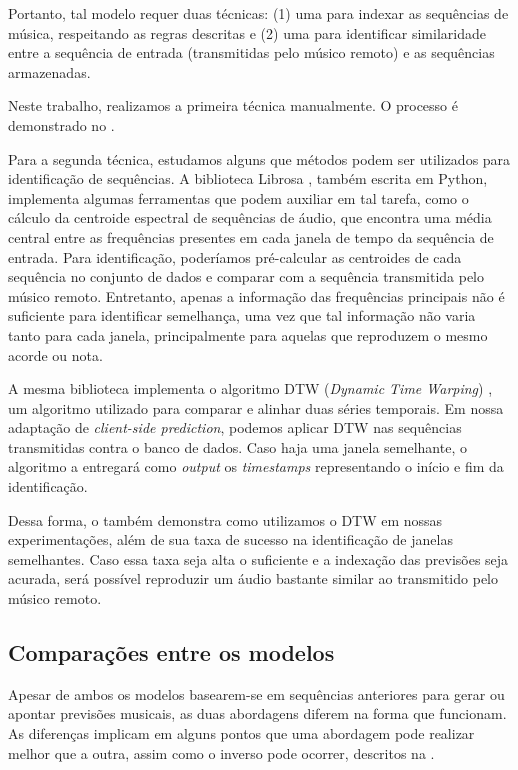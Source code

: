 Portanto, tal modelo requer duas técnicas: (1) uma para indexar as sequências de música, respeitando as regras descritas e (2) uma para identificar similaridade entre a sequência de entrada (transmitidas pelo músico remoto) e as sequências armazenadas.

Neste trabalho, realizamos a primeira técnica manualmente. O processo é demonstrado no .

Para a segunda técnica, estudamos alguns que métodos podem ser utilizados para identificação de sequências. A biblioteca Librosa \cite{librosa}, também escrita em Python, implementa algumas ferramentas que podem auxiliar em tal tarefa, como o cálculo da centroide espectral \cite{centroid} de sequências de áudio, que encontra uma média central entre as frequências presentes em cada janela de tempo da sequência de entrada. Para identificação, poderíamos pré-calcular as centroides de cada sequência no conjunto de dados e comparar com a sequência transmitida pelo músico remoto. Entretanto, apenas a informação das frequências principais não é suficiente para identificar semelhança, uma vez que tal informação não varia tanto para cada janela, principalmente para aquelas que reproduzem o mesmo acorde ou nota.

A mesma biblioteca implementa o algoritmo DTW (\textit{Dynamic Time Warping}) \cite{dtw}, um algoritmo utilizado para comparar e alinhar duas séries temporais. Em nossa adaptação de \textit{client-side prediction}, podemos aplicar DTW nas sequências transmitidas contra o banco de dados. Caso haja uma janela semelhante, o algoritmo a entregará como \textit{output} os \textit{timestamps} representando o início e fim da identificação.

Dessa forma, o  também demonstra como utilizamos o DTW em nossas experimentações, além de sua taxa de sucesso na identificação de janelas semelhantes. Caso essa taxa seja alta o suficiente e a indexação das previsões seja acurada, será possível reproduzir um áudio bastante similar ao transmitido pelo músico remoto.

\subsection{Comparações entre os modelos}

Apesar de ambos os modelos basearem-se em sequências anteriores para gerar ou apontar previsões musicais, as duas abordagens diferem na forma que funcionam. As diferenças implicam em alguns pontos que uma abordagem pode realizar melhor que a outra, assim como o inverso pode ocorrer, descritos na .

